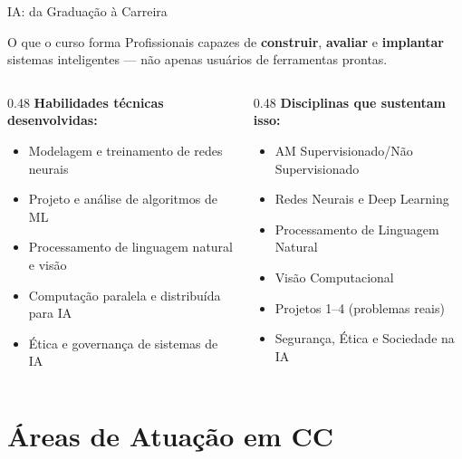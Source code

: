 \documentclass[aspectratio=169]{beamer}
\newcommand{\impt}[1]{\textcolor{morange}{\textbf{#1}}}
\newcommand{\ntc}[1]{\textcolor{mblue}{#1}}
\begin{document}
\begin{frame}{IA: da Graduação à Carreira}
  \begin{block}{O que o curso forma}
    Profissionais capazes de \impt{construir}, \impt{avaliar} e \impt{implantar} sistemas inteligentes --- não apenas usuários de ferramentas prontas.
  \end{block}
  \begin{columns}[T]
    \begin{column}{0.48\textwidth}
      \textbf{Habilidades técnicas desenvolvidas:}
      \begin{itemize}\setlength\itemsep{3pt}
        \item Modelagem e treinamento de redes neurais
        \item Projeto e análise de algoritmos de ML
        \item Processamento de linguagem natural e visão
        \item Computação paralela e distribuída para IA
        \item Ética e governança de sistemas de IA
      \end{itemize}
    \end{column}
    \begin{column}{0.48\textwidth}
      \textbf{Disciplinas que sustentam isso:}
      \begin{itemize}\setlength\itemsep{3pt}
        \item \ntc{AM Supervisionado/Não Supervisionado}
        \item \ntc{Redes Neurais e Deep Learning}
        \item \ntc{Processamento de Linguagem Natural}
        \item \ntc{Visão Computacional}
        \item \ntc{Projetos 1--4} (problemas reais)
        \item \ntc{Segurança, Ética e Sociedade na IA}
      \end{itemize}
    \end{column}
  \end{columns}
\end{frame}

\section{Áreas de Atuação em CC}
\end{document}
